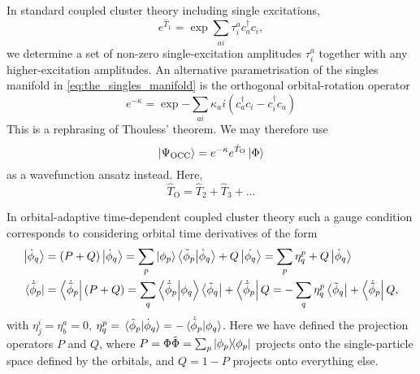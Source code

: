 \begin{tcolorbox}[title={Orbital-optimised and Bruecker coupled cluster theories
    \cite{krylov1998size,pedersen1999gauge}}, 
    colback={white},
    colbacktitle={pink},
    coltitle={black}]

    In standard coupled cluster theory including single excitations,
    \begin{equation}
        \label{eq:the_singles_manifold}
        e^{\hat{T}_1} = \exp{\sum_{ai}\tau^a_ic^\dagger_ac_i},
    \end{equation} 
    we determine a set of non-zero single-excitation amplitudes $\tau^a_i$
    together with any 
    higher-excitation amplitudes.
    An alternative parametrisation of the singles manifold
    in \autoref{eq:the_singles_manifold} is the orthogonal orbital-rotation 
    operator
    \begin{equation}
        \label{eq:the_orbital rotator}
        e^{-\kappa} = \exp{ 
            - \sum_{ai} \kappa_ai(c^\dagger_a c_i - c^\dagger_i c_a)     
        }
    \end{equation}
    This is a rephrasing of Thouless'
    theorem\cite{thouless1960stability}. We may therefore use 
    \begin{equation}
       \ket{\Psi_{\text{OCC}}} = e^{-\kappa}e^{\hat{T}_{\text{O}}}\ket{\Phi}
    \end{equation}
    as a wavefunction ansatz instead. Here,
    \begin{equation}
        \hat{T}_{\text{O}} = \hat{T}_2 + \hat{T}_3 + \dots
    \end{equation}

\end{tcolorbox}

In orbital-adaptive time-dependent coupled cluster theory such a gauge condition corresponds
to considering orbital time derivatives of the form
\begin{align}
    \label{eq:orbital_time_derivative_ket}
    \ket{\dot{\phi}_q} &= (P + Q)\ket{\dot{\phi}_q}
        = \sum_p \ket{\phi_p}\braket{\tilde{\phi}_p}{\dot{\phi}_q} 
            + Q\ket{\dot{\phi_q}}
        = \sum_p\eta^p_q + Q\ket{\dot{\phi}_q}\\
    \label{eq:orbital_time_derivative_bra}
    \bra*{\dot{\tilde{\phi}}_p} &= \bra{\dot{\tilde{\phi}}_p}(P + Q)
        = \sum_q \braket{\dot{\tilde{\phi}}_p}{\phi_q}\bra{\tilde{\phi}_q}
            + \bra{\dot{\tilde{\phi}}_p}Q
        = - \sum_q \eta^p_q \bra{\tilde{\phi}_q} + \bra{\dot{\tilde{\phi}}_p}Q,
\end{align}
with $\eta^i_j = \eta^a_b = 0$,
$\eta^p_q = \braket*{\tilde{\phi}_p}{\dot{\phi}_q} = - \braket*{\dot{\tilde{\phi}}_p}{\phi_q}$.
Here we have defined the projection operators $P$ and $Q$, where 
$P = \Phi\tilde{\Phi} = \sum_p \dyad{\phi_p}{\phi_p}$ projects onto the single-particle 
space defined by the orbitals, and $Q = 1 - P$ projects onto everything else.

